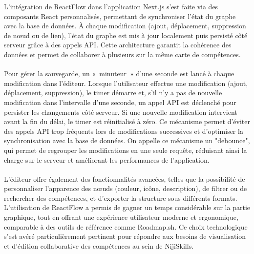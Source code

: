 \documentclass[12pt]{article}
\begin{document}
L’intégration de ReactFlow dans l’application Next.js s’est faite via des composants React personnalisés, permettant de synchroniser l’état du graphe avec la base de données. À chaque modification (ajout, déplacement, suppression de nœud ou de lien), l’état du graphe est mis à jour localement puis persisté côté serveur grâce à des appels API. Cette architecture garantit la cohérence des données et permet de collaborer à plusieurs sur la même carte de compétences.
\\\\
Pour gérer la sauvegarde, un « minuteur » d’une seconde est lancé à chaque modification dans l’éditeur. Lorsque l’utilisateur effectue une modification (ajout, déplacement, suppression), le timer démarre et, s’il n’y a pas de nouvelle modification dans l’intervalle d’une seconde, un appel API est déclenché pour persister les changements côté serveur. Si une nouvelle modification intervient avant la fin du délai, le timer est réinitialisé à zéro. Ce mécanisme permet d’éviter des appels API trop fréquents lors de modifications successives et d’optimiser la synchronisation avec la base de données.
On appelle ce mécanisme un "debounce", qui permet de regrouper les modifications en une seule requête, réduisant ainsi la charge sur le serveur et améliorant les performances de l’application.
\\\\
L’éditeur offre également des fonctionnalités avancées, telles que la possibilité de personnaliser l’apparence des nœuds (couleur, icône, description), de filtrer ou de rechercher des compétences, et d’exporter la structure sous différents formats. L’utilisation de ReactFlow a permis de gagner un temps considérable sur la partie graphique, tout en offrant une expérience utilisateur moderne et ergonomique, comparable à des outils de référence comme Roadmap.sh. Ce choix technologique s’est avéré particulièrement pertinent pour répondre aux besoins de visualisation et d’édition collaborative des compétences au sein de NijiSkills.
\end{document}
